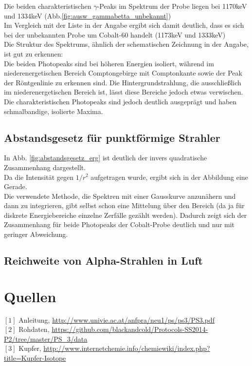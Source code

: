 \documentclass[12pt,a4paper]{article}
\begin{document}
\begin{multicols}{2}
Die beiden charakteristischen $\gamma$-Peaks im Spektrum der Probe liegen bei 1170keV und 1334keV (Abb.\ref{fig:ausw_gammabetta_unbekannt})\\
Im Vergleich mit der Liste in der Angabe ergibt sich damit deutlich, dass es sich bei der unbekannten Probe um Cobalt-60 handelt (1173keV und 1333keV)\\

\noindent Die Struktur des Spektrums, ähnlich der schematischen Zeichnung in der Angabe, ist gut zu erkennen:\\
Die beiden Photopeaks sind bei höheren Energien isoliert, während im niederenergetischen Bereich Comptongebirge mit Comptonkante sowie der Peak der Röntgenlinie zu erkennen sind. Die Hintergrundstrahlung, die ausschließlich im niederenergetischen Bereich ist, lässt diese Bereiche jedoch etwas verwischen.\\

\noindent Die charakteristischen Photopeaks sind jedoch deutlich ausgeprägt und haben schmalbandige, isolierte Maxima.

\subsection{Abstandsgesetz für punktförmige Strahler}

In Abb. \ref{fig:abstandsgesetz_erg} ist deutlich der invers quadratische Zusammenhang dargestellt.\\
Da die Intensität gegen $1/r^2$ aufgetragen wurde, ergibt sich in der Abbildung eine Gerade.\\

\noindent Die verwendete Methode, die Spektren mit einer Gausskurve anzunähern und dann zu integrieren, gibt selbst schon eine Mittelung über den Bereich (da ja für diskrete Energiebereiche einzelne Zerfälle gezählt werden). Dadurch zeigt sich der Zusammenhang für beide Photopeaks der Cobalt-Probe deutlich und nur mit geringer Abweichung.

\subsection{Reichweite von Alpha-Strahlen in Luft}



\section{Quellen}
$[1]$ Anleitung, \url{http://www.univie.ac.at/anfpra/neu1/ps/ps3/PS3.pdf}\\
$[2]$ Rohdaten, \url{https://github.com/blackandcold/Protocols-SS2014-P2/tree/master/PS_3/data}\\
$[3]$ Kupfer, \url{http://www.internetchemie.info/chemiewiki/index.php?title=Kupfer-Isotope}
\end{multicols}
\end{document}
